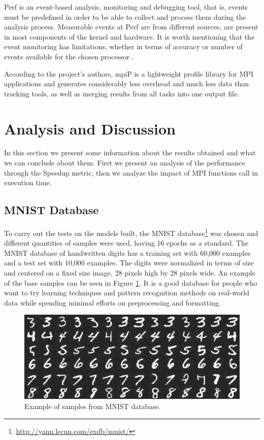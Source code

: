 \documentclass[conference]{IEEEtran}
\begin{document}
Perf is an event-based analysis, monitoring and debugging tool, that is, events must be predefined in order to be able to collect and process them during the analysis process. Measurable events at Perf are from different sources, are present in most components of the kernel and hardware. It is worth mentioning that the event monitoring has limitations, whether in terms of accuracy or number of events available for the chosen processor \cite{weaver2013linux}.

According to the project's authors, mpiP is a lightweight profile library for MPI applications and generates considerably less overhead and much less data than tracking tools, as well as merging results from all tasks into one output file.

\section{Analysis and Discussion}\label{sec:analysis}

In this section we present some information about the results obtained and what we can conclude about them. First we present an analysis of the performance through the Speedup metric, then we analyze the impact of MPI functions call in execution time.

\subsection{MNIST Database}\label{subsec:test}
To carry out the tests on the models built, the MNIST database\footnote{\url{http://yann.lecun.com/exdb/mnist/}} was chosen and different quantities of samples were used, having 16 epochs as a standard. The MNIST database of handwritten digits has a training set with 60,000 examples and a test set with 10,000 examples. The digits were normalized in terms of size and centered on a fixed size image, 28 pixels high by 28 pixels wide. An example of the base samples can be seen in Figure \ref{fig:mnist}. It is a good database for people who want to try learning techniques and pattern recognition methods on real-world data while spending minimal efforts on preprocessing and formatting.

\begin{figure}[H]
    \centering
    \includegraphics[width=\columnwidth]{images/mnist-example.png}
    \caption{Example of samples from MNIST database.}
    \label{fig:mnist}
\end{figure}
\end{document}
